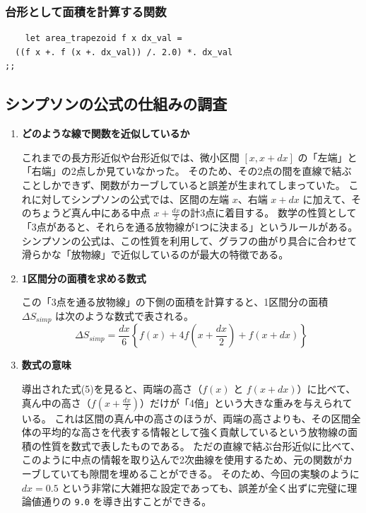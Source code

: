 \documentclass[titlepage]{ltjsarticle}
\begin{document}
\subsubsection{台形として面積を計算する関数}
\begin{verbatim}
    let area_trapezoid f x dx_val = 
  ((f x +. f (x +. dx_val)) /. 2.0) *. dx_val
;;
\end{verbatim}

\subsection{シンプソンの公式の仕組みの調査}
\begin{enumerate}
\item{\textbf{どのような線で関数を近似しているか}}
\par
これまでの長方形近似や台形近似では、微小区間 $[x, x + dx]$ の「左端」と「右端」の2点しか見ていなかった。
そのため、その2点の間を直線で結ぶことしかできず、関数がカーブしていると誤差が生まれてしまっていた。
これに対してシンプソンの公式では、区間の左端 $x$、右端 $x + dx$ に加えて、そのちょうど真ん中にある中点 $x + \frac{dx}{2}$の計3点に着目する。
数学の性質として「3点があると、それらを通る放物線が1つに決まる」というルールがある。
シンプソンの公式は、この性質を利用して、グラフの曲がり具合に合わせて滑らかな「放物線」で近似しているのが最大の特徴である。

\item{\textbf{1区間分の面積を求める数式}}
\par
この「3点を通る放物線」の下側の面積を計算すると、1区間分の面積 $\Delta S_{simp}$ は次のような数式で表される。
\begin{equation}
\Delta S_{simp} = \frac{dx}{6} \left\{ f(x) + 4f\left(x + \frac{dx}{2}\right) + f(x + dx) \right\}
\end{equation}

\item{\textbf{数式の意味}}
\par
導出された式(5)を見ると、両端の高さ（$f(x)$ と $f(x+dx)$）に比べて、真ん中の高さ（$f(x + \frac{dx}{2})$）だけが「4倍」という大きな重みを与えられている。
これは区間の真ん中の高さのほうが、両端の高さよりも、その区間全体の平均的な高さを代表する情報として強く貢献しているという放物線の面積の性質を数式で表したものである。
ただの直線で結ぶ台形近似に比べて、このように中点の情報を取り込んで2次曲線を使用するため、元の関数がカーブしていても隙間を埋めることができる。
そのため、今回の実験のように $dx = 0.5$ という非常に大雑把な設定であっても、誤差が全く出ずに完璧に理論値通りの \texttt{9.0} を導き出すことができる。
\end{enumerate}
\clearpage
\end{document}
